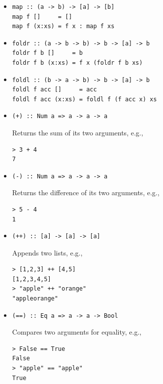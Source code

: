\documentclass[addpoints]{exam}
\begin{document}
\begin{itemize}

\item
\begin{verbatim}
map :: (a -> b) -> [a] -> [b]
map f []     = []
map f (x:xs) = f x : map f xs
\end{verbatim}

\item
\begin{verbatim}
foldr :: (a -> b -> b) -> b -> [a] -> b
foldr f b []     = b
foldr f b (x:xs) = f x (foldr f b xs)
\end{verbatim}

\item
\begin{verbatim}
foldl :: (b -> a -> b) -> b -> [a] -> b
foldl f acc []     = acc
foldl f acc (x:xs) = foldl f (f acc x) xs
\end{verbatim}

\item
\begin{verbatim}
(+) :: Num a => a -> a -> a
\end{verbatim}
Returns the sum of its two arguments, e.g.,
\begin{verbatim}
> 3 + 4
7
\end{verbatim}

\item
\begin{verbatim}
(-) :: Num a => a -> a -> a
\end{verbatim}
Returns the difference of its two arguments, e.g.,
\begin{verbatim}
> 5 - 4
1
\end{verbatim}

\item
\begin{verbatim}
(++) :: [a] -> [a] -> [a]
\end{verbatim}
Appends two lists, e.g.,
\begin{verbatim}
> [1,2,3] ++ [4,5]
[1,2,3,4,5]
> "apple" ++ "orange"
"appleorange"
\end{verbatim}

\item
\begin{verbatim}
(==) :: Eq a => a -> a -> Bool
\end{verbatim}
Compares two arguments for equality, e.g., 
\begin{verbatim}
> False == True
False
> "apple" == "apple"
True
\end{verbatim}

\end{itemize}
\end{document}
